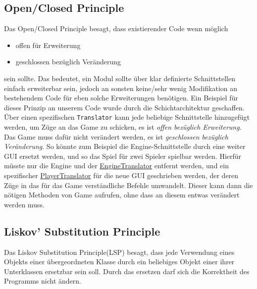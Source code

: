 \documentclass[
10pt, %
a4paper, %
oneside, %
headinclude,footinclude, %
BCOR5mm, %
]{scrartcl}
\begin{document}
\begin{onehalfspace}
\subsection{Open/Closed Principle}
Das Open/Closed Principle besagt, dass existierender Code wenn möglich
\begin{itemize}
	\item offen für Erweiterung
	\item geschlossen bezüglich Veränderung
\end{itemize}
sein sollte.
Das bedeutet, ein Modul sollte über klar definierte Schnittstellen einfach erweiterbar sein, jedoch an sonsten keine/sehr wenig Modifikation an bestehendem Code für eben solche Erweiterungen benötigen.
Ein Beispiel für dieses Prinzip an unserem Code wurde durch die Schichtarchitektur geschaffen. Über einen spezifischen \texttt{Translator} kann jede beliebige Schnittstelle hinzugefügt werden, um Züge an das Game zu schicken, es ist \textsl{offen bezüglich Erweiterung}. Das Game muss dafür nicht verändert werden, es ist \textsl{geschlossen bezüglich Veränderung}. So könnte zum Beispiel die Engine-Schnittstelle durch eine weiter GUI ersetzt werden, und so das Spiel für zwei Spieler spielbar werden. Hierfür müsste nur die Engine und der \href{https://github.com/schmida736/Chess-AdvancedSE/blob/main/Chess-AdvancedSE/Translators/EngineTranslator.cs}{EngineTranslator} entfernt werden, und ein spezifischer \href{https://github.com/schmida736/Chess-AdvancedSE/blob/main/Chess-AdvancedSE/Translators/PlayerTranslator.cs}{PlayerTranslator} für die neue GUI geschrieben werden, der deren Züge in das für das Game verständliche Befehle umwandelt. Dieser kann dann die nötigen Methoden von Game aufrufen, ohne dass an diesem entwas verändert werden muss.
\subsection{Liskov' Substitution Principle}
Das Liskov Substitution Principle(LSP) besagt, dass jede Verwendung eines Objekts einer übergeordneten Klasse durch ein beliebiges Objekt einer ihrer Unterklassen ersetzbar sein soll. Durch das ersetzen darf sich die Korrektheit des Programms nicht ändern.


\end{onehalfspace}
\end{document}
